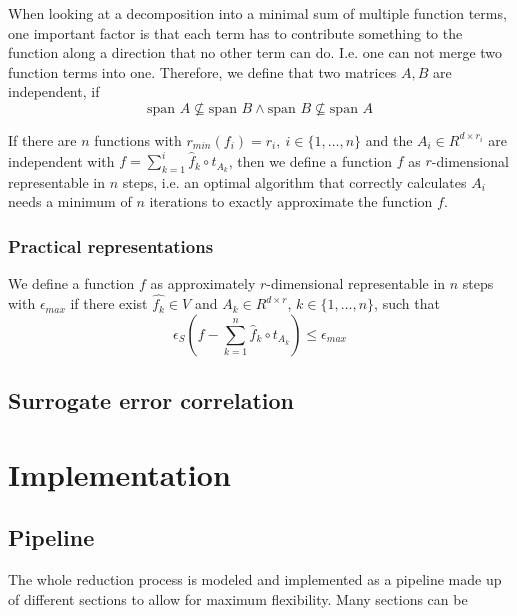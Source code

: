 \documentclass[
  a4paper,  %
  twoside,  %
  bibliography=totoc,
  headsepline,
  cleardoublepage=empty,
  parskip=half,
  draft=false
]{scrbook}
\begin{document}
When looking at a decomposition into a minimal sum of multiple function terms, one important factor is that each term has to contribute something to the function along a direction that no other term can do.
I.e. one can not merge two function terms into one.
Therefore, we define that two matrices $A,B$ are independent, if
\begin{equation}
\text{span } A \nsubseteq
\text{span } B \land \text{span } B \nsubseteq
\text{span } A
\end{equation}

If there are $n$ functions with $r_{min}(f_i) = r_i, ~ i \in \{1,\dots,n\}$ and the $A_i \in R^{d \times r_i}$ are independent with  $f=\sum_{k=1}^i \hat{f}_k \circ t_{A_k}$, then we define a function $f$ as $r$-dimensional representable in $n$ steps, i.e. an optimal algorithm that correctly calculates $A_i$ needs a minimum of $n$ iterations to exactly approximate the function $f$.

\subsection{Practical representations}

We define a function $f$ as approximately $r$-dimensional representable in $n$ steps with $\epsilon_{max}$ if there exist $\hat{f_k} \in V$ and $A_k \in R^{d \times r}$, $k \in \{1,\dots,n\}$, such that
\begin{equation}
\epsilon_{S}(f - \sum_{k=1}^n \hat{f}_k \circ t_{A_k}) \leq \epsilon_{max}
\end{equation}

\section{Surrogate error correlation}

\chapter{Implementation}


\section{Pipeline}

The whole reduction process is modeled and implemented as a pipeline made up of different sections to allow for maximum flexibility.
Many sections can be
\end{document}
